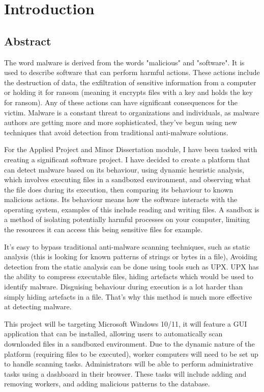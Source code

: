 \chapter{Introduction}

\section{Abstract}
The word malware is derived from the words "malicious" and "software".
It is used to describe software that can perform harmful actions.
These actions include the destruction of data,
the exfiltration of sensitive information from a computer or
holding it for ransom (meaning it encrypts files with a key and holds the key for ransom).
Any of these actions can have significant consequences for the victim.
Malware is a constant threat to organizations and individuals,
as malware authors are getting more and more sophisticated,
they've begun using new techniques that avoid detection from traditional anti-malware solutions.

For the Applied Project and Minor Dissertation module,
I have been tasked with creating a significant software project.
I have decided to create a platform that can detect malware based on its behaviour,
using dynamic heuristic analysis, which involves executing files
in a sandboxed environment, and observing what the file does during its execution,
then comparing its behaviour to known malicious actions.
Its behaviour means how the software interacts with the operating system,
examples of this include reading and writing files.
A sandbox is a method of isolating potentially harmful processes on your computer,
limiting the resources it can access this being sensitive files for example.

It's easy to bypass traditional anti-malware scanning techniques,
such as static analysis (this is looking for known patterns of strings or bytes in a file),
Avoiding detection from the static analysis can be done using tools such as UPX.
UPX has the ability to compress executable files,
hiding artefacts which would be used to identify malware. \cite{upx}
Disguising behaviour during execution is a lot harder than simply hiding artefacts in a file.
That's why this method is much more effective at detecting malware.

This project will be targeting Microsoft Windows 10/11,
it will feature a GUI application that can be installed,
allowing users to automatically scan downloaded files in a sandboxed environment.
Due to the dynamic nature of the platform (requiring files to be executed),
worker computers will need to be set up to handle scanning tasks.
Administrators will be able to perform administrative
tasks using a dashboard in their browser.
These tasks will include adding and removing workers,
and adding malicious patterns to the database.

